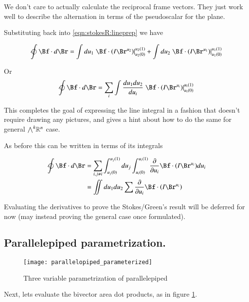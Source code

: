 We don't care to actually calculate the reciprocal frame vectors.  They just work well to describe the alternation in terms of the pseudoscalar for the plane.

Substituting back into \ref{eqn:stokesR:lineprep} we have

\begin{align*}
\ointclockwise \Bf \cdot d\Br
&=
\int du_1 \left.{\Bf \cdot \left(I \Br^{u_2}\right) }\right\vert_{u_2(0)}^{u_2(1)}
+\int du_2 \left.{\Bf \cdot \left(I \Br^{u_1}\right) }\right\vert_{u_1(0)}^{u_1(1)} \\
\end{align*}

Or
\begin{equation}\label{eqn:stokesR:lineintegral}
\ointclockwise \Bf \cdot d\Br
=
\sum_{i} \int \frac{du_1 du_2}{du_i} \left.{\Bf \cdot \left(I \Br^{u_i}\right) }\right\vert_{u_i(0)}^{u_i(1)}
\end{equation}

This completes the goal of expressing the line integral in a fashion that doesn't require drawing any pictures,
and gives a hint about how to do the same for general ${\bigwedge}^k \mathbb{R}^{n}$ case.

As before this can be written in terms of its integrals

\begin{align*}
\ointclockwise \Bf \cdot d\Br
&= \sum_{i, j \ne i} 
\int_{u_j(0)}^{u_j(1)} du_j
\int_{u_i(0)}^{u_i(1)}
 \PD{u_i}{} {\Bf \cdot \left(I \Br^{u_i}\right)} du_i \\
&= \iint du_1 du_2 \sum \PD{u_i}{} {\Bf \cdot \left(I \Br^{u_i}\right)}
\end{align*}

Evaluating the derivatives to prove the Stokes/Green's result will be deferred for now (may instead proving
the general case once formulated).

\subsection{Parallelepiped parametrization. }

\begin{figure}[htp]
\centering
\texttt{[image: parallelopiped\_parameterized]}
\caption{Three variable parametrization of  parallelepiped}\label{fig:parallelepiped}
\end{figure}

Next, lets evaluate the bivector area dot products, as in figure \ref{fig:parallelepiped}.

